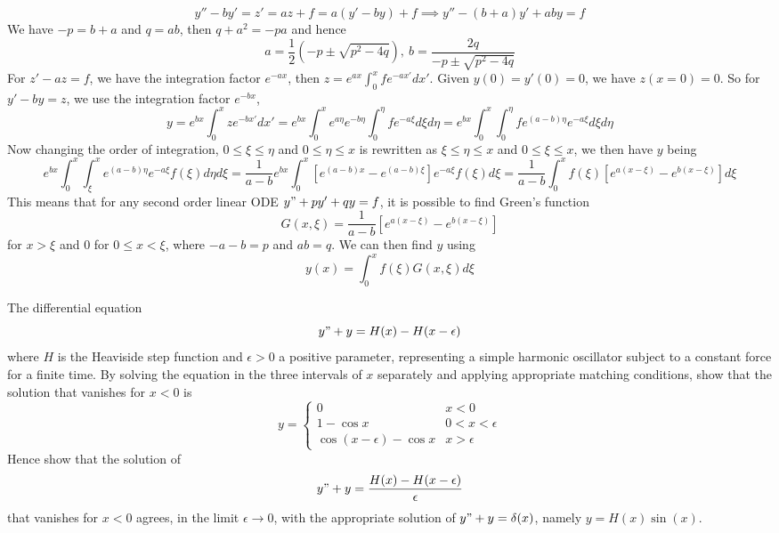 \documentclass[a4paper]{article}
\begin{document}
\begin{ans}
$$y''-by'=z'=az+f=a(y'-by)+f\implies y''-(b+a)y'+aby=f$$
We have $-p=b+a$ and $q=ab$, then $q+a^2=-pa$ and hence
$$a=\frac{1}{2}(-p\pm\sqrt{p^2-4q}),~b=\frac{2q}{-p\pm\sqrt{p^2-4q}}$$
For $z'-az=f$, we have the integration factor $e^{-ax}$, then $z=e^{ax}\int_0^xfe^{-ax'}dx'$. Given $y(0)=y'(0)=0$, we have $z(x=0)=0$. So for $y'-by=z$, we use the integration factor $e^{-bx}$,
$$y=e^{bx}\int^x_0ze^{-bx'}dx'=e^{bx}\int^x_0e^{a\eta}e^{-b\eta}\int_0^\eta fe^{-a\xi}d\xi d\eta=e^{bx}\int_0^x\int_0^\eta fe^{(a-b)\eta}e^{-a\xi}d\xi d\eta$$
Now changing the order of integration, $0\leq\xi\leq\eta$ and $0\leq\eta\leq x$ is rewritten as $\xi\leq\eta\leq x$ and $0\leq\xi\leq x$, we then have $y$ being
$$e^{bx}\int_0^x\int_{\xi}^xe^{(a-b)\eta}e^{-a\xi}f(\xi)d\eta d\xi=\frac{1}{a-b}e^{bx}\int_0^x[e^{(a-b)x}-e^{(a-b)\xi}]e^{-a\xi}f(\xi)d\xi=\frac{1}{a-b}\int_0^xf(\xi)[e^{a(x-\xi)}-e^{b(x-\xi)}]d\xi$$
This means that for any second order linear ODE $y"+py'+qy=f$, it is possible to find Green's function
$$G(x,\xi)=\frac{1}{a-b}[e^{a(x-\xi)}-e^{b(x-\xi)}]$$
for $x>\xi$ and 0 for $0\leq x<\xi$, where $-a-b=p$ and $ab=q$. We can then find $y$ using
$$y(x)=\int_0^xf(\xi)G(x,\xi)d\xi$$
\end{ans}
\begin{qns}
The differential equation
$$y"+y=H(x)-H(x-\epsilon)$$
where $H$ is the Heaviside step function and $\epsilon>0$ a positive parameter, representing a simple harmonic oscillator subject to a constant force for a finite time. By solving the equation in the three intervals of $x$ separately and applying appropriate matching conditions, show that the solution that vanishes for $x<0$ is
$$y=
\left\{
        \begin{array}{ll}
      0 & x<0 \\
      1-\cos x & 0<x<\epsilon\\
      \cos(x-\epsilon)-\cos x & x>\epsilon
        \end{array}
    \right.$$
Hence show that the solution of $$y"+y=\frac{H(x)-H(x-\epsilon)}{\epsilon}$$
that vanishes for $x<0$ agrees, in the limit $\epsilon\rightarrow 0$, with the appropriate solution of $y"+y=\delta(x)$, namely $y=H(x)\sin(x)$.
\end{qns}
\end{document}

